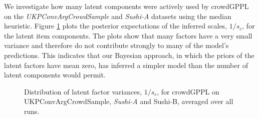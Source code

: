 We investigate how many latent components were actively used by 
 crowdGPPL on the \emph{UKPConvArgCrowdSample} and \emph{Sushi-A} datasets 
 using the median heuristic.
Figure \ref{fig:latent_factor_variance}
plots the posterior expectations of the inferred scales, $1/s_c$, for the latent item 
 components. 
 The plots show
that many factors have a very small variance and therefore do not contribute strongly 
to many of the model's predictions. This indicates that our Bayesian approach, in which the priors
of the latent factors have mean zero, has inferred a simpler model than the
number of latent components would permit.
\begin{figure}
\centering
{}
\caption{
Distribution of latent factor variances, $1/s_c$, for crowdGPPL on UKPConvArgCrowdSample, \emph{Sushi-A} and Sushi-B, averaged over all runs.
}
\label{fig:latent_factor_variance}
\end{figure}
